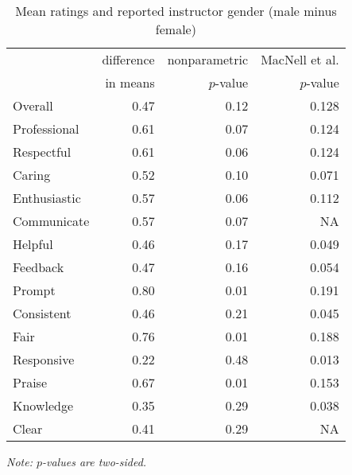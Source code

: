 \documentclass[12pt]{article}
\begin{document}
\begin{table}[htbp]
  \centering
  \footnotesize 
  \caption{Mean ratings and reported instructor gender (male minus female)}
    \begin{tabular}{lrrr}
    \toprule 
                          & difference & nonparametric & MacNell et al. \\
                          & in means  & $p$-value  &  $p$-value\\
   \midrule
    Overall &                 0.47       & 0.12  & 0.128 \\
    Professional &            0.61       & 0.07  & 0.124 \\
    Respectful  &           0.61       & 0.06  & 0.124 \\
    Caring &                  0.52       & 0.10    & 0.071\\
    Enthusiastic   &          0.57       & 0.06   & 0.112  \\
    Communicate        &      0.57       & 0.07  & NA   \\
    Helpful   &               0.46       & 0.17   & 0.049  \\
    Feedback   &              0.47       & 0.16  & 0.054   \\
    Prompt    &               0.80       & 0.01  & 0.191   \\
    Consistent   &            0.46       & 0.21  & 0.045   \\
    Fair   &                  0.76       & 0.01   & 0.188  \\
    Responsive   &            0.22       & 0.48  & 0.013   \\
    Praise   &                0.67       & 0.01  & 0.153   \\
    Knowledge   &             0.35       & 0.29 & 0.038    \\
    Clear   &                 0.41       & 0.29   & NA  \\
    \bottomrule
    \end{tabular}%
 \label{tab:macnell1}%
  
  \textit{Note: $p$-values are two-sided.}
\end{table}%
\normalsize
\end{document}
